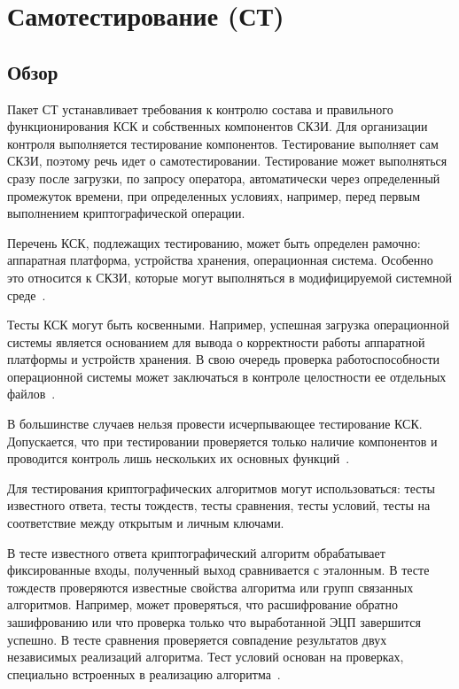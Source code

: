 \section{Самотестирование (СТ)}\label{ST}

\subsection{Обзор}\label{ST.Intro}

Пакет СТ устанавливает требования к контролю состава
и правильного функционирования КСК и собственных компонентов СКЗИ.
%
Для организации контроля выполняется тестирование компонентов.
%
Тестирование выполняет сам СКЗИ, поэтому речь идет о самотестировании.
Тестирование может выполняться сразу после загрузки,
по запросу оператора, автоматически через определенный промежуток времени,
при определенных условиях, например, перед первым выполнением криптографической 
операции.

Перечень КСК, подлежащих тестированию, может быть определен рамочно:
аппаратная платформа, устройства хранения, операционная система. 
Особенно это относится к СКЗИ, которые могут выполняться в модифицируемой 
системной среде~.

Тесты КСК могут быть косвенными. Например, успешная загрузка операционной 
системы является основанием для вывода о корректности работы аппаратной 
платформы и устройств хранения. В свою очередь проверка работоспособности 
операционной системы может заключаться в контроле целостности ее отдельных 
файлов~.  

В большинстве случаев нельзя провести исчерпывающее тестирование КСК. 
Допускается, что при тестировании проверяется только 
наличие компонентов и проводится контроль лишь нескольких их основных 
функций~.

Для тестирования криптографических алгоритмов могут использоваться:
тесты известного ответа, тесты тождеств, тесты сравнения, тесты условий, 
тесты на соответствие между открытым и личным ключами. 

В тесте известного ответа криптографический алгоритм обрабатывает
фиксированные входы, полученный выход сравнивается с эталонным.
%
В тесте тождеств проверяются известные свойства алгоритма  
или групп связанных алгоритмов. Например, может проверяться, что расшифрование 
обратно зашифрованию или что проверка только что выработанной ЭЦП завершится 
успешно.
%
В тесте сравнения проверяется совпадение результатов двух независимых
реализаций алгоритма.
%
Тест условий основан на проверках, специально встроенных в реализацию 
алгоритма~.

